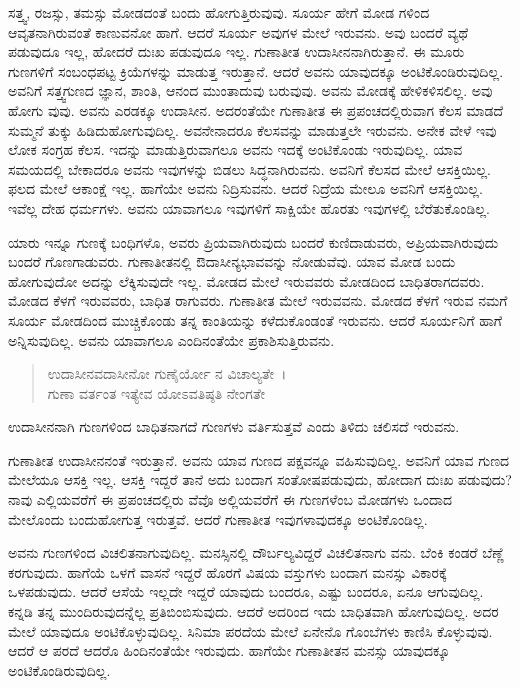 ಸತ್ತ್ವ, ರಜಸ್ಸು, ತಮಸ್ಸು ಮೋಡದಂತೆ ಬಂದು ಹೋಗುತ್ತಿರುವುವು. ಸೂರ್ಯ ಹೇಗೆ ಮೋಡ ಗಳಿಂದ ಆವೃತನಾಗಿರುವಂತೆ ಕಾಣುವನೋ ಹಾಗೆ. ಆದರೆ ಸೂರ್ಯ ಅವುಗಳ ಮೇಲೆ ಇರುವನು. ಅವು ಬಂದರೆ ವ್ಯಥೆ ಪಡುವುದೂ ಇಲ್ಲ, ಹೋದರೆ ದುಃಖ ಪಡುವುದೂ ಇಲ್ಲ. ಗುಣಾತೀತ ಉದಾಸೀನನಾಗಿರುತ್ತಾನೆ. ಈ ಮೂರು ಗುಣಗಳಿಗೆ ಸಂಬಂಧಪಟ್ಟ ಕ್ರಿಯೆಗಳನ್ನು ಮಾಡುತ್ತ ಇರುತ್ತಾನೆ. ಆದರೆ ಅವನು ಯಾವುದಕ್ಕೂ ಅಂಟಿಕೊಂಡಿರುವುದಿಲ್ಲ. ಅವನಿಗೆ ಸತ್ತ್ವಗುಣದ ಜ್ಞಾನ, ಶಾಂತಿ, ಆನಂದ ಮುಂತಾದುವು ಬರುವುವು. ಅವನು ಮೋಡಕ್ಕೆ ಹೇಳಿಕಳಿಸಲಿಲ್ಲ. ಅವು ಹೋಗು ವುವು. ಅವನು ಎರಡಕ್ಕೂ ಉದಾಸೀನ. ಅದರಂತೆಯೇ ಗುಣಾತೀತ ಈ ಪ್ರಪಂಚದಲ್ಲಿರುವಾಗ ಕೆಲಸ ಮಾಡದೆ ಸುಮ್ಮನೆ ತುಕ್ಕು ಹಿಡಿದುಹೋಗುವುದಿಲ್ಲ. ಅವನೇನಾದರೂ ಕೆಲಸವನ್ನು ಮಾಡುತ್ತಲೇ ಇರುವನು. ಅನೇಕ ವೇಳೆ ಇವು ಲೋಕ ಸಂಗ್ರಹ ಕೆಲಸ. ಇದನ್ನು ಮಾಡುತ್ತಿರುವಾಗಲೂ ಅವನು ಇದಕ್ಕೆ ಅಂಟಿಕೊಂಡು ಇರುವುದಿಲ್ಲ. ಯಾವ ಸಮಯದಲ್ಲಿ ಬೇಕಾದರೂ ಅವನು ಇವುಗಳನ್ನು ಬಿಡಲು ಸಿದ್ಧನಾಗಿರುವನು. ಅವನಿಗೆ ಕೆಲಸದ ಮೇಲೆ ಆಸಕ್ತಿಯಿಲ್ಲ. ಫಲದ ಮೇಲೆ ಆಕಾಂಕ್ಷೆ ಇಲ್ಲ. ಹಾಗೆಯೇ ಅವನು ನಿದ್ರಿಸುವನು. ಆದರೆ ನಿದ್ರೆಯ ಮೇಲೂ ಅವನಿಗೆ ಆಸಕ್ತಿಯಿಲ್ಲ. ಇವೆಲ್ಲ ದೇಹ ಧರ್ಮಗಳು. ಅವನು ಯಾವಾಗಲೂ ಇವುಗಳಿಗೆ ಸಾಕ್ಷಿಯೇ ಹೊರತು ಇವುಗಳಲ್ಲಿ ಬೆರೆತುಕೊಂಡಿಲ್ಲ.

ಯಾರು ಇನ್ನೂ ಗುಣಕ್ಕೆ ಬಂಧಿಗಳೊ, ಅವರು ಪ್ರಿಯವಾಗಿರುವುದು ಬಂದರೆ ಕುಣಿದಾಡುವರು, ಅಪ್ರಿಯವಾಗಿರುವುದು ಬಂದರೆ ಗೊಣಗಾಡುವರು. ಗುಣಾತೀತನಲ್ಲಿ ಔದಾಸೀನ್ಯಭಾವವನ್ನು ನೋಡುವೆವು. ಯಾವ ಮೋಡ ಬಂದು ಹೋಗುವುದೋ ಅದನ್ನು ಲೆಕ್ಕಿಸುವುದೇ ಇಲ್ಲ. ಮೋಡದ ಮೇಲೆ ಇರುವವರು ಮೋಡದಿಂದ ಬಾಧಿತರಾಗದವರು. ಮೋಡದ ಕೆಳಗೆ ಇರುವವರು, ಬಾಧಿತ ರಾಗುವರು. ಗುಣಾತೀತ ಮೇಲೆ ಇರುವವನು. ಮೋಡದ ಕೆಳಗೆ ಇರುವ ನಮಗೆ ಸೂರ್ಯ ಮೋಡದಿಂದ ಮುಚ್ಚಿಕೊಂಡು ತನ್ನ ಕಾಂತಿಯನ್ನು ಕಳೆದುಕೊಂಡಂತೆ ಇರುವನು. ಆದರೆ ಸೂರ್ಯನಿಗೆ ಹಾಗೆ ಅನ್ನಿಸುವುದಿಲ್ಲ. ಅವನು ಯಾವಾಗಲೂ ಎಂದಿನಂತೆಯೇ ಪ್ರಕಾಶಿಸುತ್ತಿರುವನು.

\begin{verse}
ಉದಾಸೀನವದಾಸೀನೋ ಗುಣೈರ್ಯೋ ನ ವಿಚಾಲ್ಯತೇ~।\\ಗುಣಾ ವರ್ತಂತ ಇತ್ಯೇವ ಯೋಽವತಿಷ್ಠತಿ ನೇಂಗತೇ 
\end{verse}

{\small ಉದಾಸೀನನಾಗಿ ಗುಣಗಳಿಂದ ಬಾಧಿತನಾಗದೆ ಗುಣಗಳು ವರ್ತಿಸುತ್ತವೆ ಎಂದು ತಿಳಿದು ಚಲಿಸದೆ ಇರುವನು.}

ಗುಣಾತೀತ ಉದಾಸೀನನಂತೆ ಇರುತ್ತಾನೆ. ಅವನು ಯಾವ ಗುಣದ ಪಕ್ಷವನ್ನೂ ವಹಿಸುವುದಿಲ್ಲ. ಅವನಿಗೆ ಯಾವ ಗುಣದ ಮೇಲೆಯೂ ಆಸಕ್ತಿ ಇಲ್ಲ. ಆಸಕ್ತಿ ಇದ್ದರೆ ತಾನೆ ಅದು ಬಂದಾಗ ಸಂತೋಷಪಡುವುದು, ಹೋದಾಗ ದುಃಖ ಪಡುವುದು? ನಾವು ಎಲ್ಲಿಯವರೆಗೆ ಈ ಪ್ರಪಂಚದಲ್ಲಿರು ವೆವೊ ಅಲ್ಲಿಯವರೆಗೆ ಈ ಗುಣಗಳೆಂಬ ಮೋಡಗಳು ಒಂದಾದ ಮೇಲೊಂದು ಬಂದುಹೋಗುತ್ತ ಇರುತ್ತವೆ. ಆದರೆ ಗುಣಾತೀತ ಇವುಗಳಾವುದಕ್ಕೂ ಅಂಟಿಕೊಂಡಿಲ್ಲ.

ಅವನು ಗುಣಗಳಿಂದ ವಿಚಲಿತನಾಗುವುದಿಲ್ಲ. ಮನಸ್ಸಿನಲ್ಲಿ ದೌರ್ಬಲ್ಯವಿದ್ದರೆ ವಿಚಲಿತನಾಗು ವನು. ಬೆಂಕಿ ಕಂಡರೆ ಬೆಣ್ಣೆ ಕರಗುವುದು. ಹಾಗೆಯೆ ಒಳಗೆ ವಾಸನೆ ಇದ್ದರೆ ಹೊರಗೆ ವಿಷಯ ವಸ್ತುಗಳು ಬಂದಾಗ ಮನಸ್ಸು ವಿಕಾರಕ್ಕೆ ಒಳಪಡುವುದು. ಆದರೆ ಆಸೆಯೆ ಇಲ್ಲದೇ ಇದ್ದರೆ ಯಾವುದು ಬಂದರೂ, ಎಷ್ಟು ಬಂದರೂ, ಏನೂ ಆಗುವುದಿಲ್ಲ. ಕನ್ನಡಿ ತನ್ನ ಮುಂದಿರುವುದನ್ನೆಲ್ಲ ಪ್ರತಿಬಿಂಬಿಸುವುದು. ಆದರೆ ಅದರಿಂದ ಇದು ಬಾಧಿತವಾಗಿ ಹೋಗುವುದಿಲ್ಲ. ಅದರ ಮೇಲೆ ಯಾವುದೂ ಅಂಟಿಕೊಳ್ಳುವುದಿಲ್ಲ. ಸಿನಿಮಾ ಪರದೆಯ ಮೇಲೆ ಏನೇನೊ ಗೊಂಬೆಗಳು ಕಾಣಿಸಿ ಕೊಳ್ಳುವುವು. ಆದರೆ ಆ ಪರದೆ ಆದರೊ ಹಿಂದಿನಂತೆಯೇ ಇರುವುದು. ಹಾಗೆಯೇ ಗುಣಾತೀತನ ಮನಸ್ಸು ಯಾವುದಕ್ಕೂ ಅಂಟಿಕೊಂಡಿರುವುದಿಲ್ಲ.

